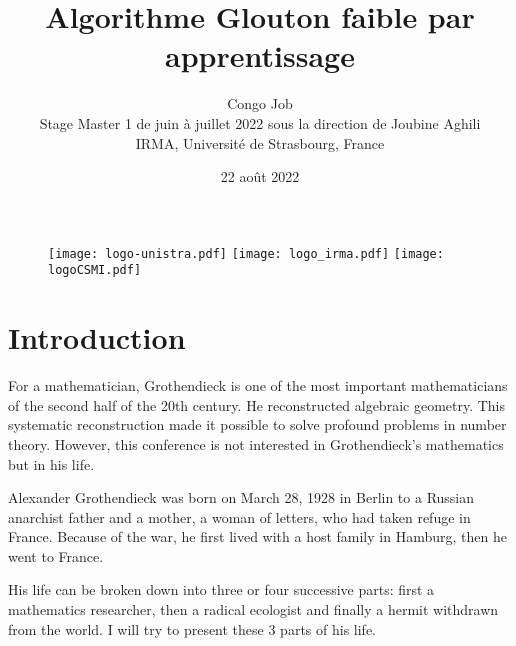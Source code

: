 \documentclass[12pt]{article}
\begin{document}
\begin{titlepage}
\title{Algorithme Glouton faible par apprentissage}
\author{Congo Job
\\ Stage Master 1 de juin à juillet 2022 sous la direction de Joubine Aghili \\
 IRMA, Université de Strasbourg, France}
\date{ 22 août 2022}

\begin{figure}[b!]
\centering
\vfill
\texttt{[image: logo-unistra.pdf]}
\hspace{0.5 cm}
\texttt{[image: logo\_irma.pdf]}
\hspace{0.5 cm}
\texttt{[image: logoCSMI.pdf]}
\end{figure}
\end{titlepage}


\maketitle
\thispagestyle{empty}


\newpage

\tableofcontents

\newpage

\section{Introduction}



For a mathematician, Grothendieck is one of the most important mathematicians of the second half of the 20th century. He reconstructed algebraic geometry. This systematic reconstruction made it possible to solve profound problems in number theory.
However, this conference is not interested in Grothendieck's mathematics but in his life.


Alexander Grothendieck was born on March 28, 1928 in Berlin to a Russian anarchist father and a mother, a woman of letters, who had taken refuge in France.
Because of the war, he first lived with a host family in Hamburg, then he went to France.


His life can be broken down into three or four successive parts: first a mathematics researcher, then a radical ecologist and finally a hermit withdrawn from the world. I will try to present these 3 parts of his life.
\end{document}
